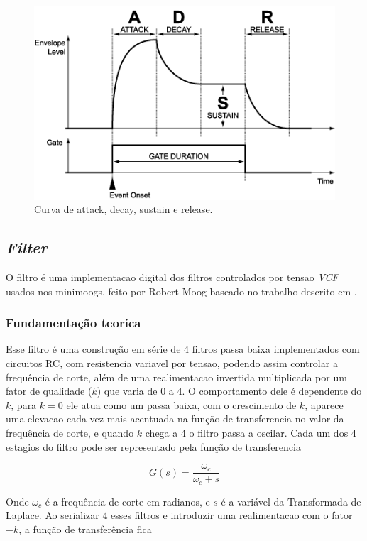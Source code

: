 \documentclass{article}
\begin{document}
\begin{figure}
\centering
\includegraphics[scale=0.3]{ADSR.png}\caption{Curva de attack, decay, sustain e release.}\label{fig:ADSR}
\end{figure}

\subsection{\emph{Filter}}


O filtro é uma implementacao digital dos filtros controlados por tensao \emph{VCF} usados nos minimoogs, feito por Robert Moog baseado no 
trabalho descrito em \cite{moog_filter}. 
\subsubsection{Fundamentação teorica}
Esse filtro
 é uma construção em série de 4 filtros passa baixa implementados com circuitos RC, com resistencia variavel por tensao, podendo assim controlar a
 frequência de corte, além de uma realimentacao invertida multiplicada por um fator de qualidade ($k$) que varia de 0 a 4.
O comportamento dele é dependente do $k$, para $k=0$ ele atua como um passa baixa, com o crescimento de $k$, aparece uma elevacao 
cada vez mais acentuada na função de transferencia no valor da frequência de corte, e quando $k$ chega a 4 o filtro passa a oscilar.
Cada um dos 4 estagios do filtro pode ser representado pela função de transferencia

\begin{equation}\label{eq:(1)}
G(s) = \frac{\omega_c}{\omega_c+s}  
\end{equation}

Onde $\omega_c$ é a frequência de corte em radianos, e $s$ é a variável da Transformada de Laplace.
Ao serializar 4 esses filtros e introduzir uma realimentacao com o fator $-k$, a função de transferência fica
\end{document}
